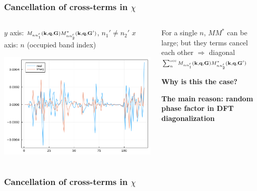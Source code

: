 \documentclass[t,aspectratio=169]{beamer}
\begin{document}
\begin{frame}
\frametitle{Cancellation of cross-terms in $\chi$}

\begin{columns}
    
\begin{column}{0.6\textwidth}
    $y$ axis: $\scriptstyle M_{n n'_1} (\vb{k}, \vb{q}, \vb{G}) M^*_{nn'_2} (\vb{k}, \vb{q}, \vb{G}')$, $n_1' \neq n_2'$
    $x$ axis: $n$ (occupied band index) 
    \begin{center}
        \includegraphics[width=\textwidth]{../data/chi/nc-n1-2000-n2-1000-nv-1-120-k_idx-12-q_idx-37-G_idx-200.png}
    \end{center}    
\end{column}

\begin{column}{0.4\textwidth}
    \faHandPointRight For a single $n$, $MM^*$ can be large;
    but they terms cancel each other $\Rightarrow$
    diagonal $\scriptstyle \sum_{n}^{\text{occ}} M_{n n'_1} (\vb{k}, \vb{q}, \vb{G}) M^*_{nn'_2} (\vb{k}, \vb{q}, \vb{G}')$
    
    \textbf{Why is this the case?}    
    
    \vspace{1cm}
    
    \faHandPointRight \textbf{The main reason: random phase factor in DFT diagonalization}
\end{column}

\end{columns}

\end{frame}

\begin{frame}
\frametitle{Cancellation of cross-terms in $\chi$}

    

\end{frame}
\end{document}
